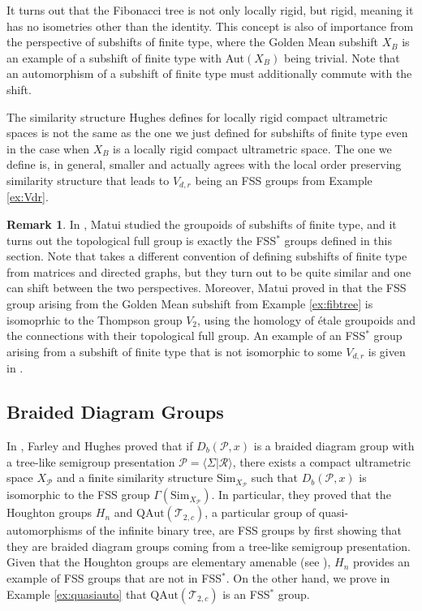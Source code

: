 \documentclass[12pt]{amsart}
\numberwithin{equation}{subsection}
\theoremstyle{definition}
\theoremstyle{definition}
\newtheorem{remark}[theorem]{Remark}
\theoremstyle{remark}
\begin{document}
It turns out that the Fibonacci tree is not only locally rigid, but rigid, meaning it has no isometries other than the identity. This concept is also of importance from the perspective of subshifts of finite type, where the Golden Mean subshift $X_B$ is an example of a subshift of finite type with Aut$(X_B)$ being trivial. Note that an automorphism of a subshift of finite type must additionally commute with the shift. 

The similarity structure Hughes defines for locally rigid compact ultrametric spaces is not the same as the one we just defined for subshifts of finite type even in the case when $X_B$ is a locally rigid compact ultrametric space. The one we define is, in general, smaller and actually agrees with the local order preserving similarity structure that leads to $V_{d,r}$ being an FSS groups from Example \ref{ex:Vdr}.  

\begin{remark}
    In \cite{Matui20215SFT}, Matui studied the groupoids of subshifts of finite type, and it turns out the topological full group is exactly the FSS$^*$ groups defined in this section. Note that \cite{Matui20215SFT} takes a different convention of defining subshifts of finite type from matrices and directed graphs, but they turn out to be quite similar and one can shift between the two perspectives. Moreover, Matui proved in \cite[Section 6.7.2]{Matui20215SFT} that the FSS group arising from the Golden Mean subshift from Example \ref{ex:fibtree} is isomoprhic to the Thompson group $V_2$, using the homology of \'etale groupoids and the connections with their topological full group. An example of an FSS$^*$ group arising from a subshift of finite type that is not isomorphic to some $V_{d,r}$ is given in  \cite[Section 6.7.3]{Matui20215SFT}.
\end{remark}


\subsection{Braided Diagram Groups}

    In \cite[Theorem 4.12]{hughes2017braided}, Farley and Hughes proved that if $D_b(\mathcal P,x)$ is a braided diagram group with a tree-like semigroup presentation $\mathcal P =\langle \Sigma \vert \mathcal R \rangle $, there exists a compact ultrametric space $X_{\mathcal P}$ and a finite similarity structure $\text{Sim}_{X_\mathcal P}$ such that $D_b(\mathcal P,x)$ is isomorphic to the FSS group $\Gamma(\text{Sim}_{X_{\mathcal P}})$. In particular, they proved that the Houghton groups $H_n$ and $\text{QAut}(\mathcal T_{2,c})$, a particular group of quasi-automorphisms of the infinite binary tree, are FSS groups by first showing that they are braided diagram groups coming from a tree-like semigroup presentation. Given that the Houghton groups are elementary amenable (see \cite{Lee2012Houghton}), $H_n$ provides an example of FSS groups that are not in FSS$^*$. On the other hand, we prove in Example \ref{ex:quasiauto} that $\text{QAut}(\mathcal T_{2,c})$ is an FSS$^*$ group. 
\end{document}
